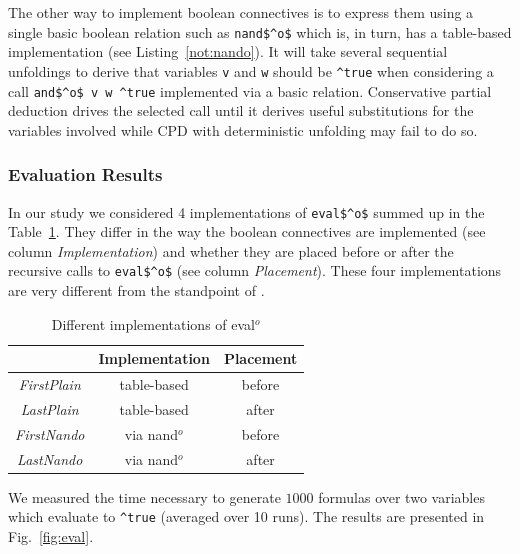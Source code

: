 The other way to implement boolean connectives is to express them using a single basic boolean relation such as \lstinline{nand$^o$} which is, in turn, has a table-based
implementation (see Listing~\ref{not:nando}). It will take several sequential unfoldings to derive that variables \lstinline{v} and \lstinline{w} should
be \lstinline{^true} when considering a call \lstinline{and$^o$ v w ^true} implemented via a basic relation.
Conservative partial deduction drives the selected call until it derives useful substitutions for the variables involved while CPD with deterministic unfolding may fail to do so.


\subsubsection{Evaluation Results}

In our study we considered 4 implementations of \lstinline{eval$^o$} summed up in the Table~\ref{tbl:eval}. They differ in the way the boolean connectives are implemented (see column \emph{Implementation}) and whether they are placed before or after the recursive calls to \lstinline{eval$^o$} (see column \emph{Placement}).
These four implementations are very different from the  standpoint of \ecce.

\begin{table}[!h]
    \centering
    \begin{tabular}{c||c||c}
                      & Implementation & Placement \\ \hline\hline
    \emph{FirstPlain} & table-based    & before \\ \hline
    \emph{LastPlain}  & table-based    & after  \\ \hline
    \emph{FirstNando} & via nand$^o$   & before \\ \hline
    \emph{LastNando}  & via nand$^o$   & after  \\
    \end{tabular}

  \caption{Different implementations of eval$^o$}
  \label{tbl:eval}
\end{table}

We measured the time necessary to generate $1000$ formulas over two variables which evaluate to \lstinline{^true} (averaged over 10 runs).
The results are presented in Fig.~\ref{fig:eval}.

